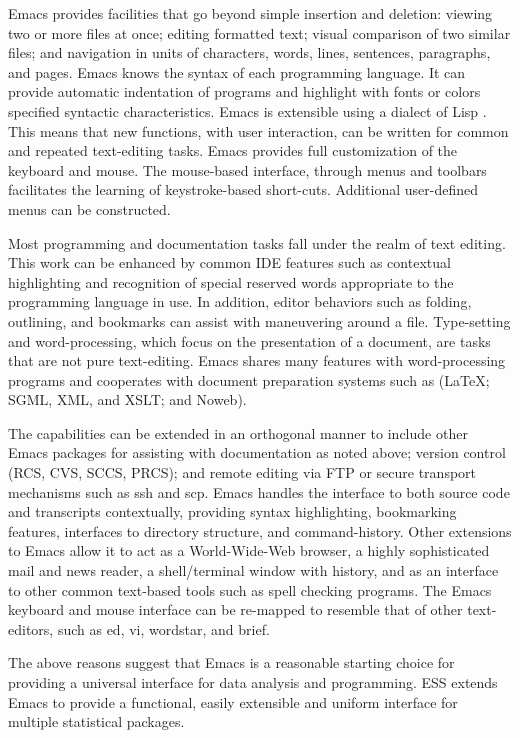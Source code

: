 \documentclass{article}
\begin{document}
Emacs provides facilities that go beyond simple insertion and
deletion: viewing two or more files at once; editing formatted text;
visual comparison of two similar files; and navigation in units of
characters, words, lines, sentences, paragraphs, and pages.  Emacs
knows the syntax of each programming language.  It can provide
automatic indentation of programs and highlight with fonts or colors
specified syntactic characteristics.  Emacs is extensible using a
dialect of Lisp \citep{RChassell1999,PGraham:1996}.  This means that
new functions, with user interaction, can be written for common and
repeated text-editing tasks.  Emacs provides full customization of the
keyboard and mouse.  The mouse-based interface, through menus and
toolbars facilitates the learning of keystroke-based short-cuts.
Additional user-defined menus can be constructed.

Most programming and documentation tasks fall under the realm of text
editing.  This work can be enhanced by common IDE features such as
contextual highlighting and recognition of special reserved words
appropriate to the programming language in use.  In addition, editor
behaviors such as folding, outlining, and bookmarks can assist with
maneuvering around a file.  Type-setting and word-processing, which
focus on the presentation of a document, are tasks that are not pure
text-editing.  Emacs shares many features with word-processing
programs and cooperates with document preparation systems such as
(\LaTeX; SGML, XML, and XSLT; and Noweb).

The capabilities can be extended in an orthogonal manner to include
other Emacs packages for assisting with documentation as noted above;
version control (RCS, CVS, SCCS, PRCS); and remote editing via FTP or
secure transport mechanisms such as ssh and scp.  Emacs handles the
interface to both source code and transcripts contextually, providing
syntax highlighting, bookmarking features, interfaces to directory
structure, and command-history.  Other extensions to Emacs allow it to
act as a World-Wide-Web browser, a highly sophisticated mail and news
reader, a shell/terminal window with history, and as an interface to
other common text-based tools such as spell checking programs.  The
Emacs keyboard and mouse interface can be re-mapped to resemble that
of other text-editors, such as ed, vi, wordstar, and brief.

The above reasons suggest that Emacs is a reasonable starting choice
for providing a universal interface for data analysis and programming.
ESS extends Emacs to provide a functional, easily extensible and
uniform interface for multiple statistical packages.
\end{document}
